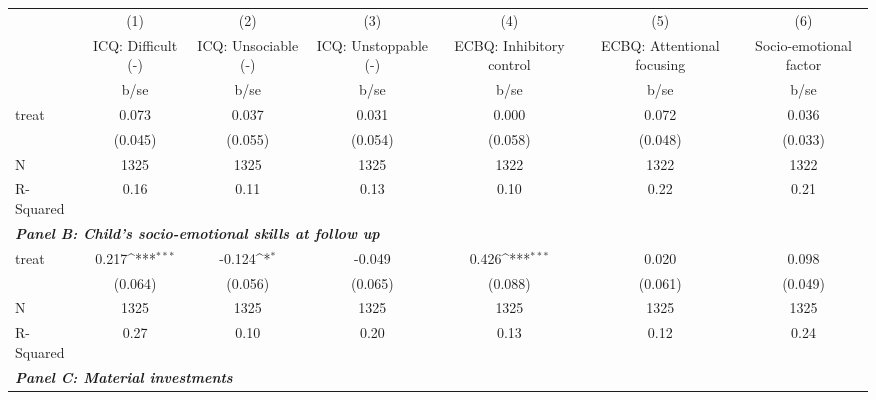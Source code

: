 {
\def\sym#1{\ifmmode^{#1}\else\(^{#1}\)\fi}
\begin{tabular}{l*{6}{c}}
\hline\hline
&\multicolumn{1}{c}{(1)}&\multicolumn{1}{c}{(2)}&\multicolumn{1}{c}{(3)}&\multicolumn{1}{c}{(4)}&\multicolumn{1}{c}{(5)}&\multicolumn{1}{c}{(6)}\\
&\multicolumn{1}{c}{ICQ: Difficult (-)}&\multicolumn{1}{c}{ICQ: Unsociable (-)}&\multicolumn{1}{c}{ICQ: Unstoppable (-)}&\multicolumn{1}{c}{ECBQ: Inhibitory control}&\multicolumn{1}{c}{ECBQ: Attentional focusing}&\multicolumn{1}{c}{Socio-emotional factor}\\
&        b/se         &        b/se         &        b/se         &        b/se         &        b/se         &        b/se         \\
\hline
treat               &       0.073         &       0.037         &       0.031         &       0.000         &       0.072         &       0.036         \\
&     (0.045)         &     (0.055)         &     (0.054)         &     (0.058)         &     (0.048)         &     (0.033)         \\
\hline
N                   &        1325         &        1325         &        1325         &        1322         &        1322         &        1322         \\
R-Squared           &        0.16         &        0.11         &        0.13         &        0.10         &        0.22         &        0.21         \\
\hline
\multicolumn{6}{l}{\linebreak \textbf{\textit{Panel B: Child's socio-emotional skills at follow up}}} \\
treat               &       0.217\sym{***}&      -0.124\sym{*}  &      -0.049         &       0.426\sym{***}&       0.020         &       0.098         \\
&     (0.064)         &     (0.056)         &     (0.065)         &     (0.088)         &     (0.061)         &     (0.049)         \\
\hline
N                   &        1325         &        1325         &        1325         &        1325         &        1325         &        1325         \\
R-Squared           &        0.27         &        0.10         &        0.20         &        0.13         &        0.12         &        0.24         \\
\hline
\multicolumn{6}{l}{\linebreak \textbf{\textit{Panel C: Material investments}}} \\

\end{tabular}}
